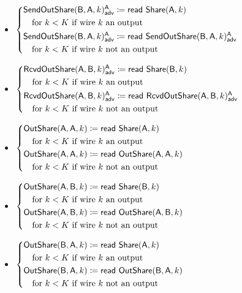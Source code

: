 \begin{itemize}
\item {\color{blue} $\begin{cases*} \LeakSendOutShare(\B,\A,k)^\A_\adv \coloneqq \read{\Share(\A,k)} \\ \hspace{10pt} \text{for $k < K$ if wire $k$ an output} \\ \LeakSendOutShare(\B,\A,k)^\A_\adv \coloneqq \read{\LeakSendOutShare(\B,\A,k)^\A_\adv} \\ \hspace{10pt} \text{for $k < K$ if wire $k$ not an output} \end{cases*}$}
\item {\color{blue} $\begin{cases*} \LeakRcvdOutShare(\A,\B,k)^\A_\adv \coloneqq \read{\Share(\B,k)} \\ \hspace{10pt} \text{for $k < K$ if wire $k$ an output} \\ \LeakRcvdOutShare(\A,\B,k)^\A_\adv \coloneqq \read{\LeakRcvdOutShare(\A,\B,k)^\A_\adv} \\ \hspace{10pt} \text{for $k < K$ if wire $k$ not an output} \end{cases*}$}
\item $\begin{cases*} \OutShare(\A,\A,k) \coloneqq \read{\Share(\A,k)} \\ \hspace{10pt} \text{for $k < K$ if wire $k$ an output} \\ \OutShare(\A,\A,k) \coloneqq \read{\OutShare(\A,\A,k)} \\ \hspace{10pt} \text{for $k < K$ if wire $k$ not an output} \end{cases*}$
\item $\begin{cases*} \OutShare(\A,\B,k) \coloneqq \read{\Share(\B,k)} \\ \hspace{10pt} \text{for $k < K$ if wire $k$ an output} \\ \OutShare(\A,\B,k) \coloneqq \read{\OutShare(\A,\B,k)} \\ \hspace{10pt} \text{for $k < K$ if wire $k$ not an output} \end{cases*}$
\item $\begin{cases*} \OutShare(\B,\A,k) \coloneqq \read{\Share(\A,k)} \\ \hspace{10pt} \text{for $k < K$ if wire $k$ an output} \\ \OutShare(\B,\A,k) \coloneqq \read{\OutShare(\B,\A,k)} \\ \hspace{10pt} \text{for $k < K$ if wire $k$ not an output} \end{cases*}$

\end{itemize}
